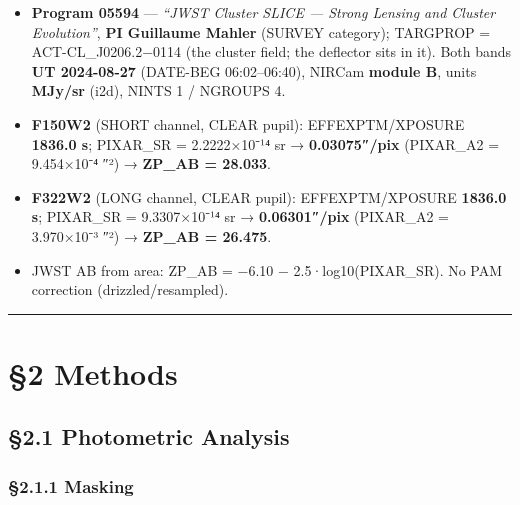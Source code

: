 \documentclass[
]{article}
\providecommand{\tightlist}{%
  \setlength{\itemsep}{0pt}\setlength{\parskip}{0pt}}
\newcommand{\BreakablePath}[1]{{\ttfamily\sloppy #1}}
\begin{document}
\begin{itemize}
\tightlist
\item
  \textbf{Program 05594} --- \emph{``JWST Cluster SLICE --- Strong
  Lensing and Cluster Evolution''}, \textbf{PI Guillaume Mahler} (SURVEY
  category); \BreakablePath{TARGPROP} = ACT-CL\_J0206.2−0114 (the
  cluster field; the deflector sits in it). Both bands \textbf{UT
  2024-08-27} (\BreakablePath{DATE-\discretionary{}{}{}BEG}
  06:02--06:40), NIRCam \textbf{module B}, units \textbf{MJy/sr} (i2d),
  NINTS 1 / NGROUPS 4.
\item
  \textbf{F150W2} (SHORT channel, CLEAR pupil):
  \BreakablePath{EFFEXPTM}/\BreakablePath{XPOSURE} \textbf{1836.0 s};
  \BreakablePath{PIXAR\_\discretionary{}{}{}SR} = 2.2222×10⁻¹⁴ sr →
  \textbf{0.03075″/pix} (PIXAR\_A2 = 9.454×10⁻⁴ ″²) → \textbf{ZP\_AB =
  28.033}.
\item
  \textbf{F322W2} (LONG channel, CLEAR pupil):
  \BreakablePath{EFFEXPTM}/\BreakablePath{XPOSURE} \textbf{1836.0 s};
  \BreakablePath{PIXAR\_\discretionary{}{}{}SR} = 9.3307×10⁻¹⁴ sr →
  \textbf{0.06301″/pix} (PIXAR\_A2 = 3.970×10⁻³ ″²) → \textbf{ZP\_AB =
  26.475}.
\item
  JWST AB from area:
  \BreakablePath{ZP\_\discretionary{}{}{}AB = −6.\discretionary{}{}{}10 − 2.\discretionary{}{}{}5·log10(PIXAR\_\discretionary{}{}{}SR)}.
  No PAM correction (drizzled/resampled).
\end{itemize}

\begin{center}\rule{0.5\linewidth}{0.5pt}\end{center}

\hypertarget{methods}{%
\section{§2 Methods}\label{methods}}

\hypertarget{photometric-analysis}{%
\subsection{§2.1 Photometric Analysis}\label{photometric-analysis}}

\hypertarget{masking}{%
\subsubsection{§2.1.1 Masking}\label{masking}}
\end{document}

